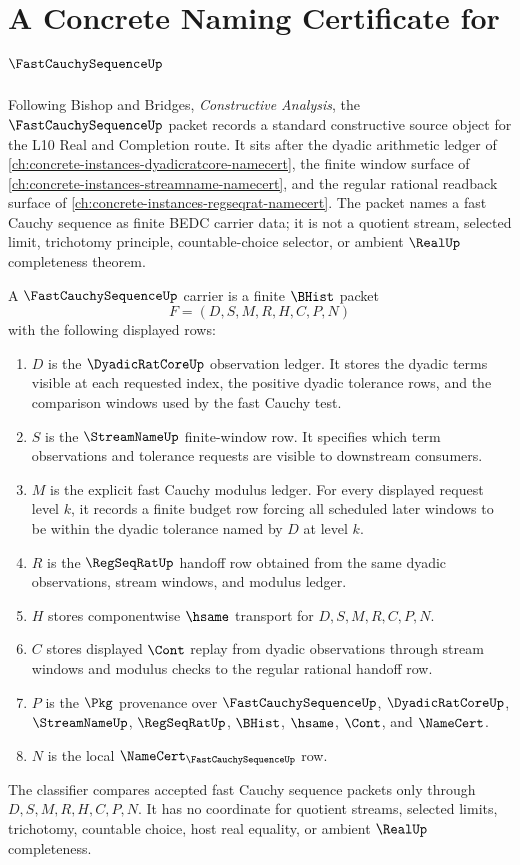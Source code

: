 \chapter{A Concrete Naming Certificate for $\FastCauchySequenceUp$}
\label{ch:concrete-instances-fast-cauchy-sequence-namecert}

Following Bishop and Bridges, \emph{Constructive Analysis}, the $\FastCauchySequenceUp$ packet records a standard constructive source object for the L10 Real and Completion route. It sits after the dyadic arithmetic ledger of \autoref{ch:concrete-instances-dyadicratcore-namecert}, the finite window surface of \autoref{ch:concrete-instances-streamname-namecert}, and the regular rational readback surface of \autoref{ch:concrete-instances-regseqrat-namecert}. The packet names a fast Cauchy sequence as finite BEDC carrier data; it is not a quotient stream, selected limit, trichotomy principle, countable-choice selector, or ambient $\RealUp$ completeness theorem.

\begin{definition}
\label{def:fast-cauchy-sequence-carrier}
A $\FastCauchySequenceUp$ carrier is a finite $\BHist$ packet
$$
F=(D,S,M,R,H,C,P,N)
$$
with the following displayed rows:
\begin{enumerate}
\item $D$ is the $\DyadicRatCoreUp$ observation ledger. It stores the dyadic terms visible at each requested index, the positive dyadic tolerance rows, and the comparison windows used by the fast Cauchy test.
\item $S$ is the $\StreamNameUp$ finite-window row. It specifies which term observations and tolerance requests are visible to downstream consumers.
\item $M$ is the explicit fast Cauchy modulus ledger. For every displayed request level $k$, it records a finite budget row forcing all scheduled later windows to be within the dyadic tolerance named by $D$ at level $k$.
\item $R$ is the $\RegSeqRatUp$ handoff row obtained from the same dyadic observations, stream windows, and modulus ledger.
\item $H$ stores componentwise $\hsame$ transport for $D,S,M,R,C,P,N$.
\item $C$ stores displayed $\Cont$ replay from dyadic observations through stream windows and modulus checks to the regular rational handoff row.
\item $P$ is the $\Pkg$ provenance over $\FastCauchySequenceUp$, $\DyadicRatCoreUp$, $\StreamNameUp$, $\RegSeqRatUp$, $\BHist$, $\hsame$, $\Cont$, and $\NameCert$.
\item $N$ is the local $\NameCert_{\FastCauchySequenceUp}$ row.
\end{enumerate}
The classifier compares accepted fast Cauchy sequence packets only through $D,S,M,R,H,C,P,N$. It has no coordinate for quotient streams, selected limits, trichotomy, countable choice, host real equality, or ambient $\RealUp$ completeness.
\end{definition}

